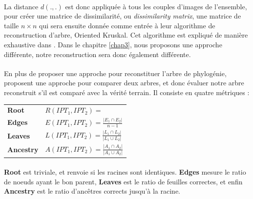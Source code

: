 \documentclass[utf8,final]{stageM2R} %
\begin{document}
\paragraph{}

La distance $d(.,.)$ est donc appliquée à tous les couples d'images de l'ensemble, pour créer une matrice de dissimilarité, ou \textit{dissimilarity matrix}, une matrice de taille $n\times n$ qui sera ensuite donnée comme entrée à leur algorithme de reconstruction d'arbre, Oriented Kruskal. Cet algorithme est expliqué de manière exhaustive dans \autocite{dias2012image}. Dans le chapitre \ref{chap3}, nous proposons une approche différente, notre reconstruction sera donc également différente. 
\paragraph{}                    

En plus de proposer une approche pour reconstituer l'arbre de phylogénie,  proposent une approche pour comparer deux arbres, et donc évaluer notre arbre reconstruit s'il est comparé avec la vérité terrain. Il consiste en quatre métriques : \\
\renewcommand{\arraystretch}{2}
\begin{tabular}{ll}
  \textbf{Root} & $
                  R(IPT_{1}, IPT_{2}) = $
                  \scalebox{0.65}{%
                  $
                  \begin{cases}
                    1 & if\ \texttt{Root(IPT}_{1}) = \texttt{Root(IPT}_{2}) \\
                    0 & Otherwise
                  \end{cases}
                        $} \\
  \textbf{Edges} & $E(IPT_{1}, IPT_{2}) = \frac{|E_{1} \cap E_{2}|} {n - 1}$ \\
  \textbf{Leaves} & $L(IPT_{1}, IPT_{2}) = \frac{|L_{1} \cap L_{2}|} {|L_{1} \cup L_{2}|}$ \\
  \textbf{Ancestry} & $A(IPT_{1}, IPT_{2}) = \frac{|A_{1} \cap A_{2}|} {|A_{1} \cup A_{2}|}$
\end{tabular}
\renewcommand{\arraystretch}{1.}
\paragraph{}

\textbf{Root} est triviale, et renvoie si les racines sont identiques. \textbf{Edges} mesure le ratio de noeuds ayant le bon parent, \textbf{Leaves} est le ratio de feuilles correctes, et enfin \textbf{Ancestry} est le ratio d'ancêtres corrects jusqu'à la racine.
\end{document}
